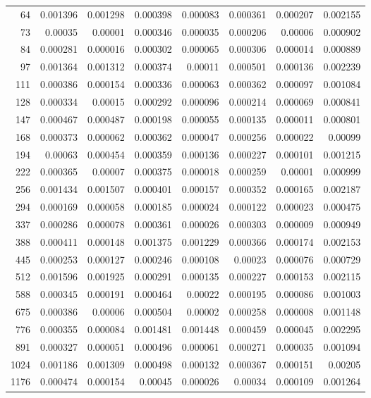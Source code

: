 \begin{tabular}{r r r r r r r r}
64 & 0.001396 & 0.001298 & 0.000398 & 0.000083 & 0.000361 & 0.000207 & 0.002155 \\
73 & 0.00035 & 0.00001 & 0.000346 & 0.000035 & 0.000206 & 0.00006 & 0.000902 \\
84 & 0.000281 & 0.000016 & 0.000302 & 0.000065 & 0.000306 & 0.000014 & 0.000889 \\
97 & 0.001364 & 0.001312 & 0.000374 & 0.00011 & 0.000501 & 0.000136 & 0.002239 \\
111 & 0.000386 & 0.000154 & 0.000336 & 0.000063 & 0.000362 & 0.000097 & 0.001084 \\
128 & 0.000334 & 0.00015 & 0.000292 & 0.000096 & 0.000214 & 0.000069 & 0.000841 \\
147 & 0.000467 & 0.000487 & 0.000198 & 0.000055 & 0.000135 & 0.000011 & 0.000801 \\
168 & 0.000373 & 0.000062 & 0.000362 & 0.000047 & 0.000256 & 0.000022 & 0.00099 \\
194 & 0.00063 & 0.000454 & 0.000359 & 0.000136 & 0.000227 & 0.000101 & 0.001215 \\
222 & 0.000365 & 0.00007 & 0.000375 & 0.000018 & 0.000259 & 0.00001 & 0.000999 \\
256 & 0.001434 & 0.001507 & 0.000401 & 0.000157 & 0.000352 & 0.000165 & 0.002187 \\
294 & 0.000169 & 0.000058 & 0.000185 & 0.000024 & 0.000122 & 0.000023 & 0.000475 \\
337 & 0.000286 & 0.000078 & 0.000361 & 0.000026 & 0.000303 & 0.000009 & 0.000949 \\
388 & 0.000411 & 0.000148 & 0.001375 & 0.001229 & 0.000366 & 0.000174 & 0.002153 \\
445 & 0.000253 & 0.000127 & 0.000246 & 0.000108 & 0.00023 & 0.000076 & 0.000729 \\
512 & 0.001596 & 0.001925 & 0.000291 & 0.000135 & 0.000227 & 0.000153 & 0.002115 \\
588 & 0.000345 & 0.000191 & 0.000464 & 0.00022 & 0.000195 & 0.000086 & 0.001003 \\
675 & 0.000386 & 0.00006 & 0.000504 & 0.00002 & 0.000258 & 0.000008 & 0.001148 \\
776 & 0.000355 & 0.000084 & 0.001481 & 0.001448 & 0.000459 & 0.000045 & 0.002295 \\
891 & 0.000327 & 0.000051 & 0.000496 & 0.000061 & 0.000271 & 0.000035 & 0.001094 \\
1024 & 0.001186 & 0.001309 & 0.000498 & 0.000132 & 0.000367 & 0.000151 & 0.00205 \\
1176 & 0.000474 & 0.000154 & 0.00045 & 0.000026 & 0.00034 & 0.000109 & 0.001264 \\

\end{tabular}
